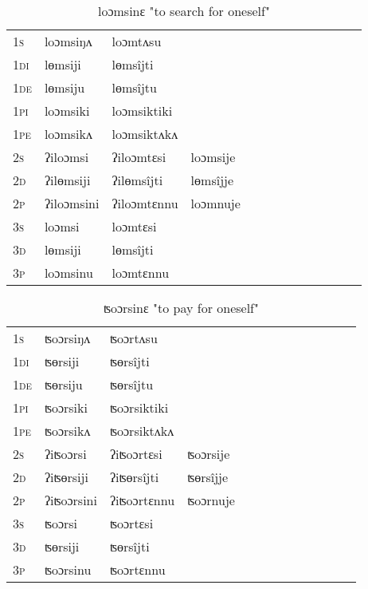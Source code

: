 \documentclass[oldfontcommands,oneside,a4paper,11pt]{article}
\begin{document}
\begin{table}[H]
\label{om.vr} \centering 
\caption{loɔmsinɛ  "to search for oneself"  }
\begin{tabular}{l|l|l|l|l|l|l|l|l|l|l|l|l}  \toprule
\textsc{1s} &loɔmsiŋʌ &loɔmtʌsu \\ 
\textsc{1di} &lɵmsiji &lɵmsîjti   \\
\textsc{1de} &lɵmsiju &lɵmsîjtu   \\ 
\textsc{1pi} &loɔmsiki &loɔmsiktiki   \\ 
\textsc{1pe} &loɔmsikʌ &loɔmsiktʌkʌ   \\ 
\textsc{2s} & ʔiloɔmsi & ʔiloɔmtɛsi &loɔmsije  \\ 
\textsc{2d} & ʔilɵmsiji & ʔilɵmsîjti &lɵmsîjje    \\
\textsc{2p} & ʔiloɔmsini  & ʔiloɔmtɛnnu &loɔmnuje  \\ 
\textsc{3s} & loɔmsi & loɔmtɛsi   \\ 
\textsc{3d} & lɵmsiji & lɵmsîjti   \\ 
\textsc{3p} & loɔmsinu  & loɔmtɛnnu \\ 
\bottomrule
\end{tabular}
\end{table}


\begin{table}[H]
\label{or.vr} \centering 
\caption{ʦoɔrsinɛ  "to pay for oneself"  }
\begin{tabular}{l|l|l|l|l|l|l|l|l|l|l|l|l}  \toprule
\textsc{1s} &ʦoɔrsiŋʌ &ʦoɔrtʌsu \\ 
\textsc{1di} &ʦɵrsiji &ʦɵrsîjti   \\
\textsc{1de} &ʦɵrsiju &ʦɵrsîjtu   \\ 
\textsc{1pi} &ʦoɔrsiki &ʦoɔrsiktiki   \\ 
\textsc{1pe} &ʦoɔrsikʌ &ʦoɔrsiktʌkʌ   \\ 
\textsc{2s} & ʔiʦoɔrsi & ʔiʦoɔrtɛsi &ʦoɔrsije  \\ 
\textsc{2d} & ʔiʦɵrsiji & ʔiʦɵrsîjti &ʦɵrsîjje    \\
\textsc{2p} & ʔiʦoɔrsini  & ʔiʦoɔrtɛnnu &ʦoɔrnuje  \\ 
\textsc{3s} & ʦoɔrsi & ʦoɔrtɛsi   \\ 
\textsc{3d} & ʦɵrsiji & ʦɵrsîjti   \\ 
\textsc{3p} & ʦoɔrsinu  & ʦoɔrtɛnnu \\ 
\bottomrule
\end{tabular}
\end{table}
\end{document}
